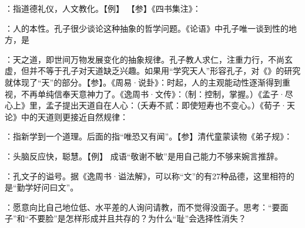 {
\item {}：指道德礼仪，人文教化。【例】 【参】《四书集注》：
\item {}：人的本性。孔子很少谈论这种抽象的哲学问题。《论语》中孔子唯一谈到性的地方，是   %
\item {}：天之道，即世间万物发展变化的抽象规律。孔子教人求仁，注重力行，不尚玄虚，但并不等于孔子对天道缺乏兴趣。如果用“学究天人”形容孔子，对《》的研究就体现了“天”的部分。【参】。《周易·说卦》：时起，人的主观能动性逐渐得到重视，不再单纯信奉天意神力了。《逸周书·文传》：（制：控制，掌握。）《孟子·尽心上》里，孟子提出天道自在人心：（夭寿不贰：即使短寿也不变心。）《荀子·天论》中的天道则更接近自然规律：
}
{}  %


{
\item {}：指新学到一个道理。后面的指“唯恐又有闻”。【参】清代童蒙读物《弟子规》：
}
{}


{
\item {}：头脑反应快，聪慧。【例】 成语“敬谢不敏”是用自己能力不够来婉言推辞。
\item {}：孔文子的谥号。据《逸周书·谥法解》，可以称“文”的有27种品德，这里相符的是“勤学好问曰文”。
\item {}：愿意向比自己地位低、水平差的人询问请教，而不觉得没面子。思考：“要面子”和“不要脸”是怎样形成并且共存的？为什么“耻”会选择性消失？
}
{}


